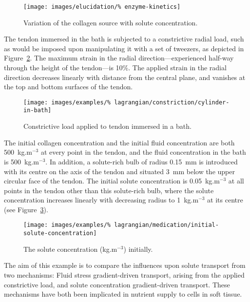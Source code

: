 \begin{figure}[!hpt]
  \centering
  \texttt{[image: images/elucidation/\%
    enzyme-kinetics]}
  \caption{Variation of the collagen source with solute
    concentration.}
  \label{eg3menten}
\end{figure}

The tendon immersed in the bath is subjected to a constrictive radial
load, such as would be imposed upon manipulating it with a set of
tweezers, as depicted in Figure~\ref{constrictload}. The maximum
strain in the radial direction---experienced half-way through the
height of the tendon---is 10\%. The applied strain in the radial
direction decreases linearly with distance from the central plane, and
vanishes at the top and bottom surfaces of the tendon.

\begin{figure}[!t]
  \centering
  \texttt{[image: images/examples/\%
    lagrangian/constriction/cylinder-in-bath]}
  \caption{Constrictive load applied to tendon immersed in a bath.}
  \label{constrictload}
\end{figure}

The initial collagen concentration and the initial fluid concentration
are both 500~kg.m$^{-3}$ at every point in the tendon, and the fluid
concentration in the bath is 500~kg.m$^{-3}$. In addition, a
solute-rich bulb of radius 0.15~mm is introduced with its centre on
the axis of the tendon and situated 3~mm below the upper circular face
of the tendon. The initial solute concentration is 0.05~kg.m$^{-3}$ at
all points in the tendon other than this solute-rich bulb, where the
solute concentration increases linearly with decreasing radius to
1~kg.m$^{-3}$ at its centre (see Figure~\ref{eg3ini}).

\begin{figure}[!hpt]
  \centering
  \texttt{[image: images/examples/\%
    lagrangian/medication/initial-solute-concentration]}
  \caption{The solute concentration (kg.m$^{-3}$) initially.}
  \label{eg3ini}
\end{figure}

The aim of this example is to compare the influences upon solute
transport from two mechanisms: Fluid stress gradient-driven transport,
arising from the applied constrictive load, and solute concentration
gradient-driven transport. These mechanisms have both been implicated
in nutrient supply to cells in soft tissue.


